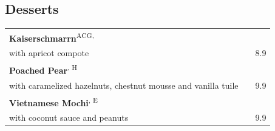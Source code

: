 \documentclass[a4paper,12pt]{article}
\newcommand{\vegan}{\textbf{\scriptsize \color{vegan}{Vegan}}}
\newcommand{\vegetarisch}{\textbf{\scriptsize \color{vegan}{Veg}}}
\begin{document}
\begin{multicols}{2}
\section*{Desserts}
\begin{tabular}{Lrr}
\textbf{Kaiserschmarrn}\textsuperscript{{\scriptsize ACG, \vegetarisch}}\\
\hspace{0.4cm}\scriptsize with apricot compote & & 8.9\\
\textbf{Poached Pear}\textsuperscript{{\scriptsize \vegan, H}}\\
\hspace{0.4cm}\scriptsize with caramelized hazelnuts, chestnut mousse and vanilla tuile & & 9.9\\
\textbf{Vietnamese Mochi}\textsuperscript{{\scriptsize \vegan, E}}\\
\hspace{0.4cm}\scriptsize with coconut sauce and peanuts & & 9.9
\end{tabular}


\end{multicols}
\end{document}
